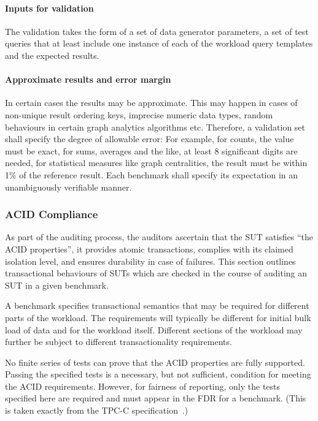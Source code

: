 \paragraph{Inputs for validation}
The validation takes the form of a set of data generator parameters, a set of test queries that at least include one instance of each of the workload query templates and the expected results.

\paragraph{Approximate results and error margin}
In certain cases the results may be approximate. This may happen in cases of non-unique result ordering keys, imprecise numeric data types, random behaviours in certain graph analytics algorithms etc. Therefore, a validation set shall specify the degree of allowable error: For example, for counts, the value must be exact, for sums, averages and the like, at least 8 significant digits are needed, for statistical measures like graph centralities, the result must be within 1\% of the reference result. Each benchmark shall specify its expectation in an unambiguously verifiable manner.


\subsubsection{ACID Compliance}

As part of the auditing process, the auditors ascertain that the SUT satisfies ``the ACID properties'', \ie it provides atomic transactions, complies with its claimed isolation level, and ensures durability in case of failures.
This section outlines transactional behaviours of SUTs which are checked in the course of auditing an SUT in a given benchmark.

A benchmark specifies transactional semantics that may be required for different parts of the workload. The requirements will typically be different for initial bulk load of data and for the workload itself. Different sections of the workload may further be subject to different transactionality requirements.

No finite series of tests can prove that the ACID properties are fully supported. Passing the specified tests is a necessary, but not sufficient, condition for meeting the ACID requirements. However, for fairness of reporting, only the tests specified here are required  and  must appear in  the FDR for  a benchmark. (This is taken exactly from the TPC-C specification~\cite{tpcc}.)

